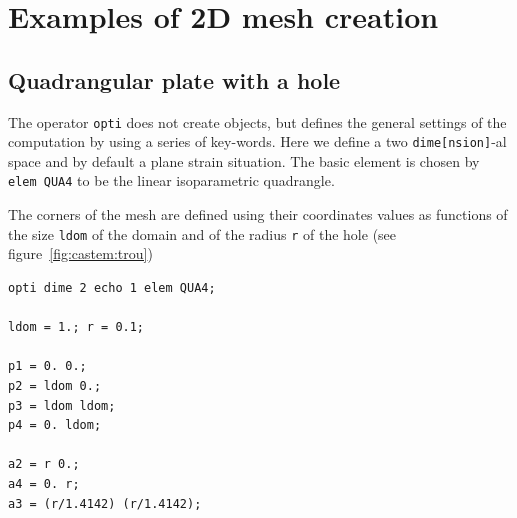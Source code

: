 \section{Examples of 2D mesh creation}

\subsection*{Quadrangular plate with a hole}

\begin{castemcom}
The operator \texttt{opti} does not create objects, but defines the general settings of the 
computation by using a series of key-words. Here we define a two \texttt{dime[nsion]}-al 
space and by default a plane strain situation. The basic element is chosen 
by \texttt{elem QUA4} to be the linear isoparametric quadrangle. 

The corners of the mesh are defined using their coordinates 
values as functions of the size \texttt{ldom} of the domain 
and of the radius  \texttt{r} of the hole
(see figure~\ref{fig:castem:trou})

\end{castemcom}
\begin{castemlines}
\begin{verbatim}
opti dime 2 echo 1 elem QUA4; 

ldom = 1.; r = 0.1; 

p1 = 0. 0.; 
p2 = ldom 0.; 
p3 = ldom ldom; 
p4 = 0. ldom; 

a2 = r 0.; 
a4 = 0. r; 
a3 = (r/1.4142) (r/1.4142); 
\end{verbatim}
\end{castemlines}

